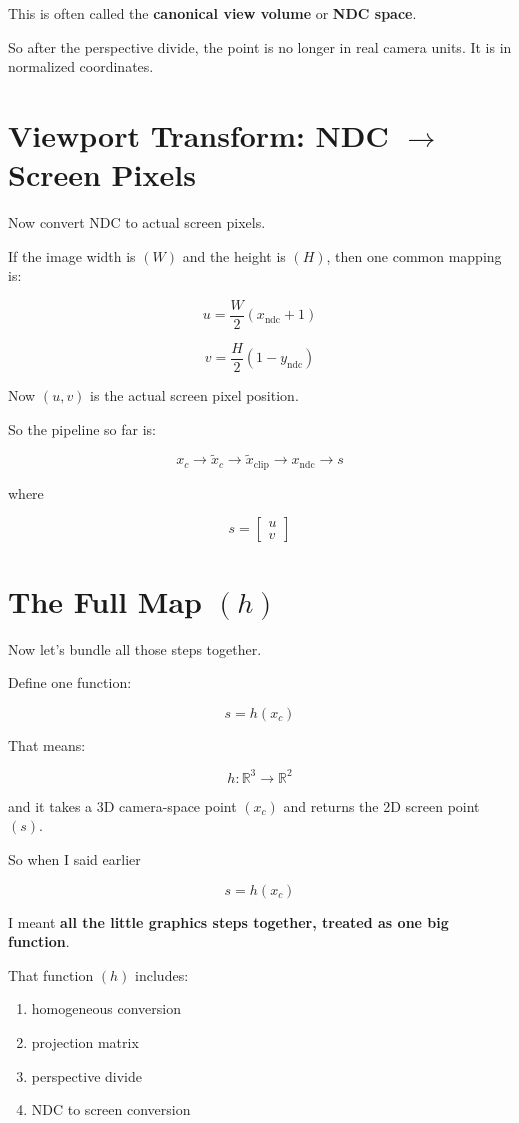\documentclass[11pt,letterpaper]{article}
\begin{document}
This is often called the \textbf{canonical view volume} or \textbf{NDC space}.

So after the perspective divide, the point is no longer in real camera units. It is in normalized coordinates.

\section{Viewport Transform: \texorpdfstring{NDC $\to$ Screen Pixels}{NDC to Screen Pixels}}

Now convert NDC to actual screen pixels.

If the image width is $(W)$ and the height is $(H)$, then one common mapping is:

\[
u = \frac{W}{2}(x_{\text{ndc}} + 1)
\]

\[
v = \frac{H}{2}(1 - y_{\text{ndc}})
\]

Now $(u,v)$ is the actual screen pixel position.

So the pipeline so far is:

\[
x_c \to \tilde{x}_c \to \tilde{x}_{\text{clip}} \to x_{\text{ndc}} \to s
\]

where

\[
s =
\begin{bmatrix}
u\\
v
\end{bmatrix}
\]

\section{The Full Map \texorpdfstring{$(h)$}{(h)}}

Now let's bundle all those steps together.

Define one function:

\[
s = h(x_c)
\]

That means:

\[
h : \mathbb{R}^3 \to \mathbb{R}^2
\]

and it takes a 3D camera-space point $(x_c)$ and returns the 2D screen point $(s)$.

So when I said earlier

\[
s = h(x_c)
\]

I meant \textbf{all the little graphics steps together, treated as one big function}.

That function $(h)$ includes:

\begin{enumerate}
\item homogeneous conversion
\item projection matrix
\item perspective divide
\item NDC to screen conversion
\end{enumerate}
\end{document}
